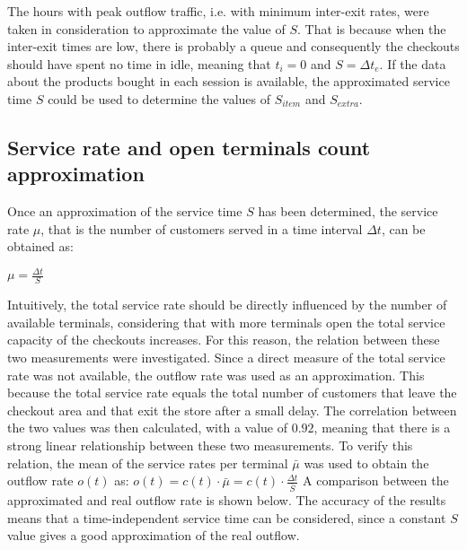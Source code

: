 The hours with peak outflow traffic, i.e. with minimum inter-exit rates, were taken in consideration to approximate the value of $ S $. That is because when the inter-exit times are low, there is probably a queue and consequently the checkouts should have spent no time in idle, meaning that $ t_i = 0 $ and $ S = \Delta t_e $. If the data about the products bought in each session is available, the approximated service time $ S $ could be used to determine the values of $ S_{item} $ and $ S_{extra} $.

\subsection{Service rate and open terminals count approximation}
\label{subsec:service_rate_and_open_terminals_count_approximation}
Once an approximation of the service time $ S $ has been determined, the service rate $ \mu $, that is the number of customers served in a time interval $ \Delta t $, can be obtained as:

$ \mu = \frac{\Delta t}{S}$

Intuitively, the total service rate should be directly influenced by the number of available terminals, considering that with more terminals open the total service capacity of the checkouts increases. For this reason, the relation between these two measurements were investigated. Since a direct measure of the total service rate was not available, the outflow rate was used as an approximation. This because the total service rate equals the total number of customers that leave the checkout area and that exit the store after a small delay. The correlation between the two values was then calculated, with a value of $ 0.92 $, meaning that there is a strong linear relationship between these two measurements.
To verify this relation, the mean of the service rates per terminal $ \bar{\mu} $ was used to obtain the outflow rate $ o(t) $ as:
$ o(t) = c(t) \cdot \bar{\mu} = c(t) \cdot \frac{\Delta t}{\bar{S}} $
A comparison between the approximated and real outflow rate is shown below. The accuracy of the results means that a time-independent service time can be considered, since a constant $ S $ value gives a good approximation of the real outflow.


\clearpage